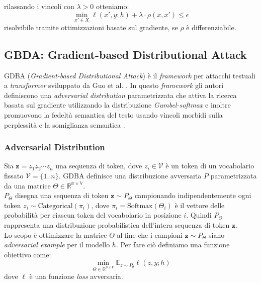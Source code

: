 rilassando i vincoli con \(\lambda>0\) otteniamo:
\begin{equation}
\min_{x' \in X} \mathcal{\ell}(x', y; h)+\lambda \cdot \rho(x, x') \leq \epsilon
\end{equation}
risolvibile tramite ottimizzazioni basate sul gradiente, se \(\rho\) \`e differenziabile.\\

\subsection{GBDA: Gradient-based Distributional Attack}
GDBA (\emph{Gradient-based Distributional Attack}) \`e il \emph{framework} per attacchi testuali a \emph{transformer} sviluppato da Guo et al. \cite{guo2021gradientbasedadversarialattackstext}. In questo \emph{framework} gli autori definiscono una \emph{adversarial distribution} parametrizzata che attiva la ricerca basata sul gradiente utilizzando la distribuzione \emph{Gumbel-softmax} e inoltre promuovono la fedelt\`a semantica del testo usando vincoli morbidi sulla perplessit\`a e la somiglianza semantica \cite{guo2021gradientbasedadversarialattackstext}.

\subsubsection{Adversarial Distribution}
Sia \(\textbf{z}=z_1z_2\cdots z_n\) una sequenza di token, dove \(z_i\in\mathcal{V}\) \`e un token di un vocabolario fissato \(\mathcal{V}=\{1..n\}\). GDBA definisce una distribuzione avversaria \(P\) parametrizzata da una matrice \(\Theta\in\mathbb{R^{n\times V}}\). \\
\(P_\Theta\) disegna una sequenza di token \(\textbf{z}\sim P_\Theta\) campionando indipendentemente ogni token \(z_i\sim \text{Categorical}(\pi_i)\), dove \(\pi_i=\text{Softmax}(\Theta_i)\) \`e il vettore delle probabilit\`a per ciascun token del vocabolario in posizione \(i\). Quindi \(P_\Theta\) rappresenta una distribuzione probabilistica dell'intera sequenza di token \(\textbf{z}\).\\
Lo scopo \`e ottimizzare la matrice \(\Theta\) al fine che i campioni \(\textbf{z}\sim P_\Theta\) siano \emph{adversarial example} per il modello \(h\). Per fare ci\`o definiamo una funzione obiettivo come:
\begin{equation} \label{eq:gradient_adversarial_distribution_objective_function}
\min_{\Theta\in\mathbb{R}^{n\times V}}\mathbb{E}_{z \sim P_{\theta}}\ell(z, y; h)
\end{equation}
dove \(\ell\) \`e una funzione \emph{loss} avversaria.

